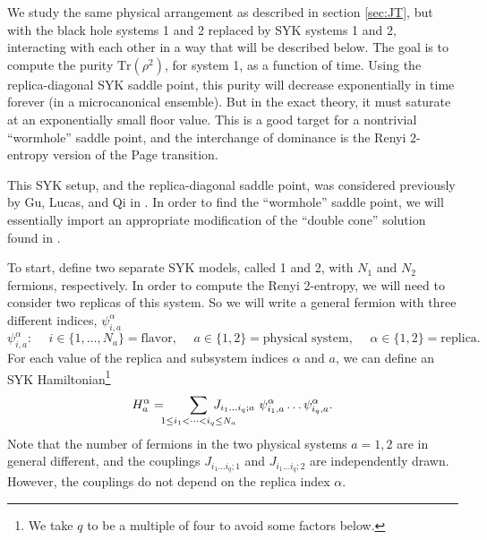 \documentclass[11pt]{article}
\newcommand{\be}{\begin{equation}}
\newcommand{\ee}{\end{equation}}
\numberwithin{equation}{section}
\def\tr{\text{Tr}}
\begin{document}
We study the same physical arrangement as described in section \ref{sec:JT}, but with the black hole systems 1 and 2 replaced by SYK systems 1 and 2, interacting with each other in a way that will be described below. The goal is to compute the purity $\tr (\rho^2)$, for system 1, as a function of time. Using the replica-diagonal SYK saddle point, this purity will decrease exponentially in time forever (in a microcanonical ensemble). But in the exact theory, it must saturate at an exponentially small floor value. This is a good target for a nontrivial ``wormhole'' saddle point, and the interchange of dominance is the Renyi 2-entropy version of the Page transition.

This SYK setup, and the replica-diagonal saddle point, was considered previously by Gu, Lucas, and Qi in \cite{Gu:2017njx}. In order to find the ``wormhole'' saddle point, we will essentially import an appropriate modification of the ``double cone'' solution found in \cite{Saad:2018bqo}. 

To start, define two separate SYK models, called 1 and 2, with $N_1$ and $N_2$ fermions, respectively. In order to compute the Renyi 2-entropy, we will need to consider two replicas of this system. So we will write a general fermion with three different indices, $\psi_{i,a}^\alpha$
\be
\psi_{i,a}^\alpha: \hspace{15pt} i \in \{1,\dots,N_a\} = \text{flavor}, \hspace{15pt} a \in \{1,2\} = \text{physical system}, \hspace{15pt} \alpha \in \{1,2\} = \text{replica}.
\ee
For each value of the replica and subsystem indices $\alpha$ and $a$, we can define an SYK Hamiltonian\footnote{We take $q$ to be a multiple of four to avoid some factors below.}
\be
H_a^\alpha = \hspace{-5pt}\sum_{1\le i_1<\dots <i_q\le N_a}\hspace{-20pt}J_{i_1\dots i_q;a} \ \psi_{i_1,a}^\alpha\dots \psi_{i_q,a}^\alpha.
\ee
Note that the number of fermions in the two physical systems $a = 1,2$ are in general different, and the couplings $J_{i_1\dots i_q;1}$ and $J_{i_1\dots i_q;2}$ are independently drawn. However, the couplings do not depend on the replica index $\alpha$.
\end{document}
